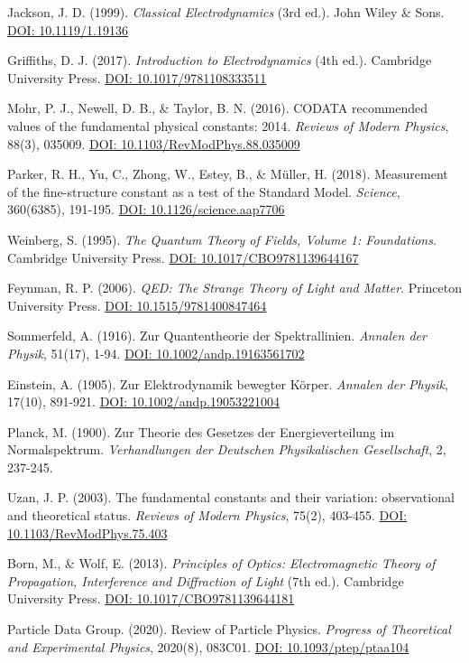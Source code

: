 \documentclass[12pt,a4paper]{article}
\begin{document}
		
	\begin{thebibliography}{12}
		 Jackson, J. D. (1999). \textit{Classical Electrodynamics} (3rd ed.). John Wiley \& Sons. \href{https://doi.org/10.1119/1.19136}{DOI: 10.1119/1.19136}
		
		 Griffiths, D. J. (2017). \textit{Introduction to Electrodynamics} (4th ed.). Cambridge University Press. \href{https://doi.org/10.1017/9781108333511}{DOI: 10.1017/9781108333511}
		
		 Mohr, P. J., Newell, D. B., \& Taylor, B. N. (2016). CODATA recommended values of the fundamental physical constants: 2014. \textit{Reviews of Modern Physics}, 88(3), 035009. \href{https://doi.org/10.1103/RevModPhys.88.035009}{DOI: 10.1103/RevModPhys.88.035009}
		
		 Parker, R. H., Yu, C., Zhong, W., Estey, B., \& Müller, H. (2018). Measurement of the fine-structure constant as a test of the Standard Model. \textit{Science}, 360(6385), 191-195. \href{https://doi.org/10.1126/science.aap7706}{DOI: 10.1126/science.aap7706}
		
		 Weinberg, S. (1995). \textit{The Quantum Theory of Fields, Volume 1: Foundations}. Cambridge University Press. \href{https://doi.org/10.1017/CBO9781139644167}{DOI: 10.1017/CBO9781139644167}
		
		 Feynman, R. P. (2006). \textit{QED: The Strange Theory of Light and Matter}. Princeton University Press. \href{https://doi.org/10.1515/9781400847464}{DOI: 10.1515/9781400847464}
		
		 Sommerfeld, A. (1916). Zur Quantentheorie der Spektrallinien. \textit{Annalen der Physik}, 51(17), 1-94. \href{https://doi.org/10.1002/andp.19163561702}{DOI: 10.1002/andp.19163561702}
		
		 Einstein, A. (1905). Zur Elektrodynamik bewegter Körper. \textit{Annalen der Physik}, 17(10), 891-921. \href{https://doi.org/10.1002/andp.19053221004}{DOI: 10.1002/andp.19053221004}
		
		 Planck, M. (1900). Zur Theorie des Gesetzes der Energieverteilung im Normalspektrum. \textit{Verhandlungen der Deutschen Physikalischen Gesellschaft}, 2, 237-245.
		
		 Uzan, J. P. (2003). The fundamental constants and their variation: observational and theoretical status. \textit{Reviews of Modern Physics}, 75(2), 403-455. \href{https://doi.org/10.1103/RevModPhys.75.403}{DOI: 10.1103/RevModPhys.75.403}
		
		 Born, M., \& Wolf, E. (2013). \textit{Principles of Optics: Electromagnetic Theory of Propagation, Interference and Diffraction of Light} (7th ed.). Cambridge University Press. \href{https://doi.org/10.1017/CBO9781139644181}{DOI: 10.1017/CBO9781139644181}
		
		 Particle Data Group. (2020). Review of Particle Physics. \textit{Progress of Theoretical and Experimental Physics}, 2020(8), 083C01. \href{https://doi.org/10.1093/ptep/ptaa104}{DOI: 10.1093/ptep/ptaa104}
	\end{thebibliography}
	
\end{document}
